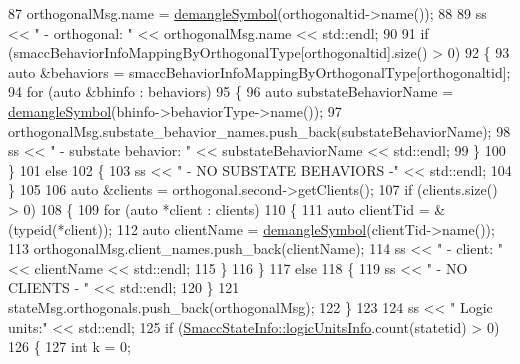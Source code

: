 \begin{DoxyCode}
87             orthogonalMsg.name = \hyperlink{namespacesmacc_a458f5e70d468824fbcd66cc7729deaa8}{demangleSymbol}(orthogonaltid->name());
88 
89             ss << \textcolor{stringliteral}{" - orthogonal: "} << orthogonalMsg.name << std::endl;
90 
91             \textcolor{keywordflow}{if} (smaccBehaviorInfoMappingByOrthogonalType[orthogonaltid].size() > 0)
92             \{
93                 \textcolor{keyword}{auto} &behaviors = smaccBehaviorInfoMappingByOrthogonalType[orthogonaltid];
94                 \textcolor{keywordflow}{for} (\textcolor{keyword}{auto} &bhinfo : behaviors)
95                 \{
96                     \textcolor{keyword}{auto} substateBehaviorName = \hyperlink{namespacesmacc_a458f5e70d468824fbcd66cc7729deaa8}{demangleSymbol}(bhinfo->behaviorType->name());
97                     orthogonalMsg.substate\_behavior\_names.push\_back(substateBehaviorName);
98                     ss << \textcolor{stringliteral}{"          - substate behavior: "} << substateBehaviorName << std::endl;
99                 \}
100             \}
101             \textcolor{keywordflow}{else}
102             \{
103                 ss << \textcolor{stringliteral}{"          - NO SUBSTATE BEHAVIORS -"} << std::endl;
104             \}
105 
106             \textcolor{keyword}{auto} &clients = orthogonal.second->getClients();
107             \textcolor{keywordflow}{if} (clients.size() > 0)
108             \{
109                 \textcolor{keywordflow}{for} (\textcolor{keyword}{auto} *client : clients)
110                 \{
111                     \textcolor{keyword}{auto} clientTid = &(\textcolor{keyword}{typeid}(*client));
112                     \textcolor{keyword}{auto} clientName = \hyperlink{namespacesmacc_a458f5e70d468824fbcd66cc7729deaa8}{demangleSymbol}(clientTid->name());
113                     orthogonalMsg.client\_names.push\_back(clientName);
114                     ss << \textcolor{stringliteral}{"          - client: "} << clientName << std::endl;
115                 \}
116             \}
117             \textcolor{keywordflow}{else}
118             \{
119                 ss << \textcolor{stringliteral}{"          - NO CLIENTS - "} << std::endl;
120             \}
121             stateMsg.orthogonals.push\_back(orthogonalMsg);
122         \}
123 
124         ss << \textcolor{stringliteral}{" Logic units:"} << std::endl;
125         \textcolor{keywordflow}{if} (\hyperlink{classsmacc_1_1SmaccStateInfo_a7a22f3c1ea22042a19f897db4ecfeb67}{SmaccStateInfo::logicUnitsInfo}.count(statetid) > 0)
126         \{
127             \textcolor{keywordtype}{int} k = 0;

\end{DoxyCode}

